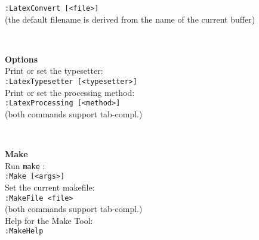 \documentclass[oneside,10pt,landscape,DIV16]{scrartcl}
\begin{document}
\begin{multicols}{3}
\begin{center}
\begin{minipage}[b]{70mm}
\texttt{:LatexConvert [<file>]} \\[1.0ex]
(the default filename is derived from the name of the current buffer)
\end{minipage}
\\[2.5ex]
%
\begin{minipage}[b]{70mm}%
\large{\textbf{Options}}\\[1.0ex]
Print or set the typesetter: \\[1.0ex]
\texttt{:LatexTypesetter [<typesetter>]} \\[1.0ex]
Print or set the processing method: \\[1.0ex]
\texttt{:LatexProcessing [<method>]} \\[1.0ex]
(both commands support tab-compl.)
\end{minipage}
\\[2.5ex]
%
\begin{minipage}[b]{70mm}%
\large{\textbf{Make}}\\[1.0ex]
Run \texttt{make} : \\[1.0ex]
\texttt{:Make [<args>]} \\[1.0ex]
Set the current makefile: \\[1.0ex]
\texttt{:MakeFile <file>} \\[1.0ex]
(both commands support tab-compl.) \\[1.0ex]
Help for the Make Tool: \\[1.0ex]
\texttt{:MakeHelp} \\[2.5ex]
\end{minipage}
%
\end{center}%
\end{multicols}%
%
\end{document}

